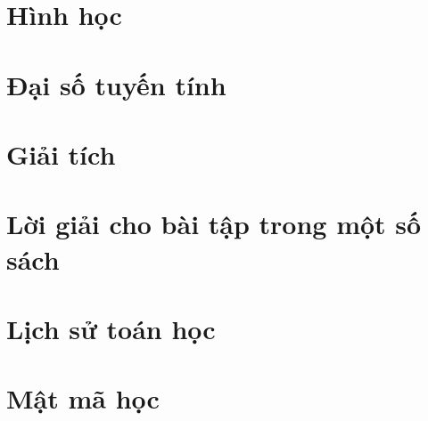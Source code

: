 \documentclass[oneside]{book}
\begin{document}
\part{Hình học}



\part{Đại số tuyến tính}



\part{Giải tích}





\part{Lời giải cho bài tập trong một số sách}



\part{Lịch sử toán học}


\part{Mật mã học}





\medskip


\end{document}
